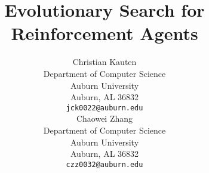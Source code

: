 \title{Evolutionary Search for Reinforcement Agents}

\author{
	Christian Kauten \\
	Department of Computer Science \\
	Auburn University \\
	Auburn, AL 36832 \\
	\texttt{jck0022@auburn.edu} \\
	\And
	Chaowei Zhang \\
	Department of Computer Science \\
	Auburn University \\
	Auburn, AL 36832 \\
	\texttt{czz0032@auburn.edu} \\
}

\maketitle

